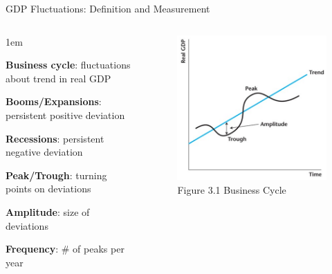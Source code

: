 \documentclass[11pt,aspectratio=43]{beamer}
\let\olditemize=\itemize
\let\endolditemize=\enditemize
\renewenvironment{itemize}{\olditemize \itemsep1em}{\endolditemize}
\theoremstyle{definition}
\begin{document}
\begin{frame}{GDP Fluctuations: Definition and Measurement}
\label{slide:GDP_Fluctuations__Definition_and_Measurement}
    \begin{columns}
        \begin{column}{0.5\textwidth}
            \begin{itemize}
                \item \textbf{Business cycle}: fluctuations about trend in real GDP
                \item \textbf{Booms/Expansions}: persistent \alert{positive} deviation
                \item \textbf{Recessions}: persistent \alert{negative} deviation
                \item \textbf{Peak/Trough}: turning points on deviations
                \item \textbf{Amplitude}: size of deviations
                \item \textbf{Frequency}: \# of peaks per year
            \end{itemize}
        \end{column}
        \begin{column}{0.5\textwidth}
            \begin{figure}
                \caption{Figure 3.1 Business Cycle}
                \includegraphics[width=\textwidth]{./figures/Fugre3_1.jpg}
            \end{figure}
        \end{column}
    \end{columns}
\end{frame}
\end{document}
